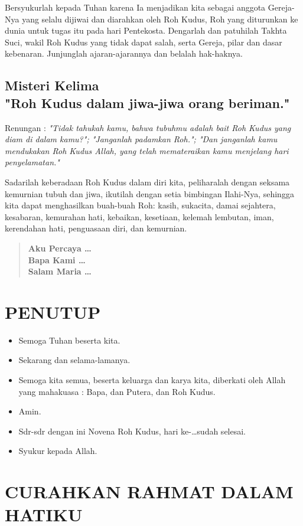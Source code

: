 \documentclass{scrartcl}
\newcommand{\roleSay}[2]{\begin{itemize} \item[#1:] #2 \end{itemize}}
\newcommand{\BU}[1]{\roleSay{U}{#1}}
\newcommand{\BP}[1]{\roleSay{P}{#1}}
\begin{document}
Bersyukurlah kepada Tuhan karena Ia menjadikan kita sebagai anggota Gereja-Nya yang selalu dijiwai dan diarahkan oleh Roh Kudus, Roh yang diturunkan ke dunia untuk tugas itu pada hari Pentekosta. Dengarlah dan patuhilah Takhta Suci, wakil Roh Kudus yang tidak dapat salah, serta Gereja, pilar dan dasar kebenaran. Junjunglah ajaran-ajarannya dan belalah hak-haknya.

\BSK

\subsection*{Misteri Kelima\\"Roh Kudus dalam jiwa-jiwa orang beriman."}

Renungan : \textit{"Tidak tahukah kamu, bahwa tubuhmu adalah bait Roh Kudus yang diam di dalam kamu?"; "Janganlah padamkan Roh."; "Dan janganlah kamu mendukakan Roh Kudus Allah, yang telah memateraikan kamu menjelang hari penyelamatan."}

Sadarilah keberadaan Roh Kudus dalam diri kita, peliharalah dengan seksama kemurnian tubuh dan jiwa, ikutilah dengan setia bimbingan Ilahi-Nya, sehingga kita dapat menghasilkan buah-buah Roh: kasih, sukacita, damai sejahtera, kesabaran, kemurahan hati, kebaikan, kesetiaan, kelemah lembutan, iman, kerendahan hati, penguasaan diri, dan kemurnian.

\BSK

\begin{quote}
\textbf{Aku Percaya \ldots\\
Bapa Kami \ldots\\
Salam Maria \ldots}
\end{quote}


\section{PENUTUP}

\BP{Semoga Tuhan beserta kita.}

\BU{Sekarang dan selama-lamanya.}

\BP{Semoga kita semua, beserta keluarga dan karya kita, diberkati oleh
Allah yang mahakuasa : \Cross{} Bapa, dan Putera, dan Roh Kudus.}

\BU{Amin.}

\BP{Sdr-sdr dengan ini Novena Roh Kudus, hari ke-\ldots sudah selesai.}

\BU{Syukur kepada Allah.}

\section*{CURAHKAN RAHMAT DALAM HATIKU}
\end{document}
